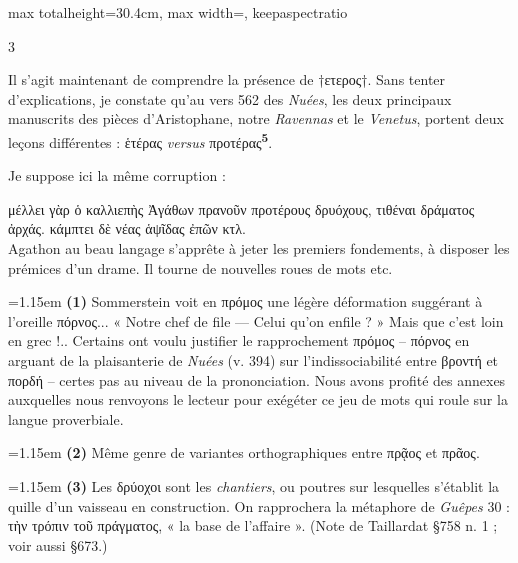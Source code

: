 \documentclass[11pt,twoside]{book}
\newcommand{\italique}[1]{\textit{#1}}
\newcommand{\citComm}[1]{\begin{quoting}[vskip=0.4pt,leftmargin=0.7em,rightmargin=0.2em]#1\end{quoting}}
\newcommand{\marqueur}[1]{\textsuperscript{\color{rubricRed}\textbf{#1}}}
\begin{document}
\begin{adjustbox}{max totalheight=30.4cm, max width=\textwidth, keepaspectratio}
\begin{minipage}{\textwidth}
{\begin{multicols}{3}
\par\vspace{1.5pt}
\noindent Il s'agit maintenant de comprendre la présence de †ετερος†. Sans tenter d'explications, je constate qu'au vers 562 des \italique{Nuées}, les deux principaux manuscrits des pièces d'Aristophane, notre \italique{Ravennas} et le \italique{Venetus}, portent deux leçons différentes : ἑτέρας \italique{versus} προτέρας\marqueur{5}.
\par\vspace{1.5pt}
\noindent Je suppose ici la même corruption :
\citComm{μέλλει γὰρ ὁ καλλιεπὴς Ἀγάθων πρανοῦν προτέρους δρυόχους, τιθέναι δράματος ἀρχάς. κάμπτει δὲ νέας ἁψῖδας ἐπῶν κτλ.\\
Agathon au beau langage s'apprête à jeter les premiers fondements, à disposer les prémices d'un drame. Il tourne de nouvelles roues de mots etc.}
\par\vspace{1.5pt}
\par\vspace{1.2pt}\par\nopagebreak\vspace{1pt}\noindent\hangindent=1.15em {\color{sepiaNote}\textbf{(1)}} Sommerstein voit en πρόμος une légère déformation suggérant à l'oreille πόρνος... « Notre chef de file --- Celui qu'on enfile ? » Mais que c'est loin en grec !.. Certains ont voulu justifier le rapprochement πρόμος -- πόρνος en arguant de la plaisanterie de \italique{Nuées} (v. 394) sur l'indissociabilité entre βροντή et πορδή -- certes pas au niveau de la prononciation. Nous avons profité des annexes auxquelles nous renvoyons le lecteur pour exégéter ce jeu de mots qui roule sur la langue proverbiale.
\par\vspace{1.5pt}
\noindent\hangindent=1.15em {\color{sepiaNote}\textbf{(2)}} Même genre de variantes orthographiques entre πρᾷος et πρᾶος.
\par\vspace{1.5pt}
\noindent\hangindent=1.15em {\color{sepiaNote}\textbf{(3)}} Les δρύοχοι sont les \italique{chantiers}, ou poutres sur lesquelles s'établit la quille d'un vaisseau en construction. On rapprochera la métaphore de \italique{Guêpes} 30 : τὴν τρόπιν τοῦ πράγματος, « la base de l'affaire ». (Note de Taillardat §758 n. 1 ; voir aussi §673.)
\par\vspace{1.5pt}

\end{multicols}}
\end{minipage}
\end{adjustbox}
\end{document}
